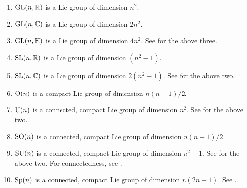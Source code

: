 \documentclass[12pt]{article}
\begin{document}
\begin{enumerate}[label=(\alph*)]
	\item $\operatorname{GL}(n, \mathbb{R})$ is a Lie group of dimension $n^{2}$.
	\item $\operatorname{GL}(n, \mathbb{C})$ is a Lie group of dimension $2n^{2}$.
	\item $\operatorname{GL}(n, \mathbb{H})$ is a Lie group of dimension $4n^{2}$. \newline
	See  for the above three.
	\item $\operatorname{SL}(n, \mathbb{R})$ is a Lie group of dimension $(n^{2} - 1)$.
	\item $\operatorname{SL}(n, \mathbb{C})$ is a Lie group of dimension $2(n^{2} - 1)$. \newline
	See  for the above two.
	\item $\operatorname{O}(n)$ is a compact Lie group of dimension $n(n - 1)/2$.
	\item $\operatorname{U}(n)$ is a connected, compact Lie group of dimension $n^{2}$. \newline
	See  for the above two.
	\item $\operatorname{SO}(n)$ is a connected, compact Lie group of dimension $n(n - 1)/2$.
	\item $\operatorname{SU}(n)$ is a connected, compact Lie group of dimension $n^{2} - 1$. \newline
	See  for the above two. For connectedness, see .
	\item $\operatorname{Sp}(n)$ is a connected, compact Lie group of dimension $n(2n + 1)$. See .
\end{enumerate}
\end{document}
